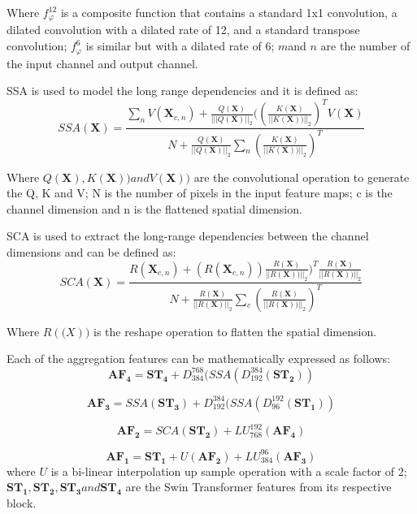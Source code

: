 Where $f^{12}_\varphi$ is a composite function that contains a standard 1x1 convolution, a dilated convolution with a dilated rate of 12, and a standard transpose convolution; $f^{6}_\varphi$ is similar but with a dilated rate of 6; $m $and $n$ are the number of the input channel and output channel.

SSA is used to model the long range dependencies and it is defined as: 
\begin{equation}
    SSA(\mathbf{X}) = \frac{\sum_n V(\mathbf{X}_{c,n})+\frac{Q(\mathbf{X})}{|||Q(\mathbf{X})||_2} ((\frac{K(\mathbf{X})}{||K(\mathbf{X}))||_2})^T V(\mathbf{X})}
    {N + \frac{Q(\mathbf{X})}{||Q(\mathbf{X})||_2} \sum_n(\frac{K(\mathbf{X})}{||K(\mathbf{X}))||_2})^T }
\end{equation}

Where $Q(\mathbf{X}), K(\mathbf{X})) and V(\mathbf{X}))$ are the convolutional operation to generate the Q, K and V; N is the number of pixels in the input feature maps; c is the channel dimension and n is the flattened spatial dimension.

SCA is used to extract the long-range dependencies between the channel dimensions and can be defined as:
\begin{equation}
    SCA(\mathbf{X}) = \frac{ R(\mathbf{X}_{c,n})+(R(\mathbf{X}_{c,n}))\frac{R(\mathbf{X})}{||R(\mathbf{X}))||_2})^T \frac{R(\mathbf{X})}{||R(\mathbf{X}))||_2} }
    {N + \frac{R(\mathbf{X})}{||R(\mathbf{X})||_2} \sum_c(\frac{R(\mathbf{X})}{||R(\mathbf{X}))||_2})^T }
\end{equation}

Where $R(\mathbf(X))$ is the reshape operation to flatten the spatial dimension.

Each of the aggregation features can be mathematically expressed as follows:
\begin{equation}
    \mathbf{AF_4} = \mathbf{ST_4} + D^{768}_{384} (SSA(D^{384}_{192}(\mathbf{ST_2}))
\end{equation}

\begin{equation}
    \mathbf{AF_3} = SSA(\mathbf{ST_3})+ D^{384}_{192} (SSA(D^{192}_{96}(\mathbf{ST_1}))
\end{equation}

\begin{equation}
    \mathbf{AF_2} = SCA(\mathbf{ST_2})+ LU^{192}_{768} (\mathbf{AF_4})
\end{equation}

\begin{equation}
    \mathbf{AF_1} = \mathbf{ST_1} + U(\mathbf{AF_2}) + LU^{96}_{384}(\mathbf{AF_3})
\end{equation}
where $U$ is a bi-linear interpolation up sample operation with a scale factor of 2; $\mathbf{ST_1}, \mathbf{ST_2}, \mathbf{ST_3} and \mathbf{ST_4}$ are the Swin Transformer features from its respective block.
